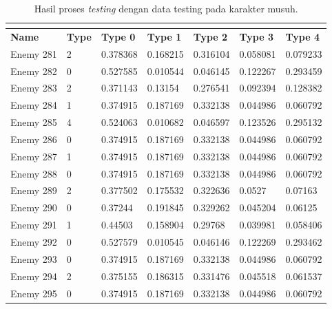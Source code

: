 \begin{longtable}{|l|l|l|l|l|l|l|}
	\caption{Hasil proses \textit{testing} dengan data testing pada karakter musuh.}
	\vspace{1ex}
	\label{tb:enemy_valid_result}\\
	\hline
	\rowcolor[HTML]{C0C0C0} 
	\textbf{Name} & \textbf{Type} & \textbf{Type 0} & \textbf{Type 1} & \textbf{Type 2} & \textbf{Type 3} & \textbf{Type 4} \\ \hline
	Enemy 281 & 2 & 0.378368 & {\color[HTML]{FE0000} 0.168215} & 0.316104 & 0.058081 & 0.079233 \\ \hline
	Enemy 282 & 0 & {\color[HTML]{FE0000} 0.527585} & 0.010544 & 0.046145 & 0.122267 & 0.293459 \\ \hline
	Enemy 283 & 2 & 0.371143 & 0.13154 & {\color[HTML]{FE0000} 0.276541} & 0.092394 & 0.128382 \\ \hline
	Enemy 284 & 1 & 0.374915 & {\color[HTML]{FE0000} 0.187169} & 0.332138 & 0.044986 & 0.060792 \\ \hline
	Enemy 285 & 4 & 0.524063 & 0.010682 & 0.046597 & 0.123526 & {\color[HTML]{FE0000} 0.295132} \\ \hline
	Enemy 286 & 0 & {\color[HTML]{009901} 0.374915} & 0.187169 & 0.332138 & 0.044986 & 0.060792 \\ \hline
	Enemy 287 & 1 & 0.374915 & {\color[HTML]{FE0000} 0.187169} & 0.332138 & 0.044986 & 0.060792 \\ \hline
	Enemy 288 & 0 & {\color[HTML]{FE0000} 0.374915} & 0.187169 & 0.332138 & 0.044986 & 0.060792 \\ \hline
	Enemy 289 & 2 & 0.377502 & 0.175532 & {\color[HTML]{FE0000} 0.322636} & 0.0527 & 0.07163 \\ \hline
	Enemy 290 & 0 & {\color[HTML]{009901} 0.37244} & 0.191845 & 0.329262 & 0.045204 & 0.06125 \\ \hline
	Enemy 291 & 1 & 0.44503 & {\color[HTML]{FE0000} 0.158904} & 0.29768 & 0.039981 & 0.058406 \\ \hline
	Enemy 292 & 0 & {\color[HTML]{009901} 0.527579} & 0.010545 & 0.046146 & 0.122269 & 0.293462 \\ \hline
	Enemy 293 & 0 & {\color[HTML]{009901} 0.374915} & 0.187169 & 0.332138 & 0.044986 & 0.060792 \\ \hline
	Enemy 294 & 2 & 0.375155 & 0.186315 & {\color[HTML]{FE0000} 0.331476} & 0.045518 & 0.061537 \\ \hline
	Enemy 295 & 0 & {\color[HTML]{009901} 0.374915} & 0.187169 & 0.332138 & 0.044986 & 0.060792 \\ \hline

\end{longtable}
